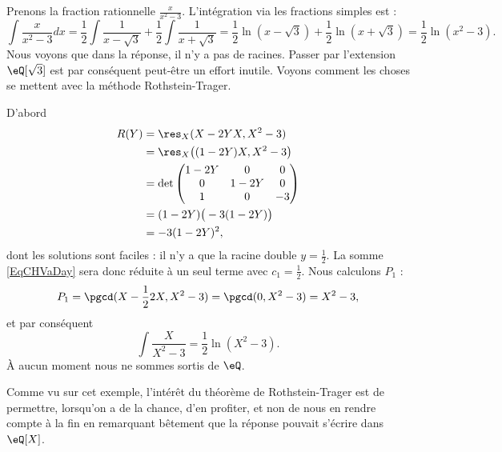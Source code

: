 \begin{example}
	Prenons la fraction rationnelle \( \frac{ x }{ x^2-3 }\). L'intégration via les fractions simples est :
	\begin{equation}
		\int\frac{ x }{ x^2-3 }dx=\frac{ 1 }{2}\int\frac{ 1 }{ x-\sqrt{3} }+\frac{ 1 }{2}\int\frac{1}{ x+\sqrt{3} }=\frac{ 1 }{2}\ln(x-\sqrt{3})+\frac{ 1 }{2}\ln(x+\sqrt{3})=\frac{ 1 }{2}\ln(x^2-3).
	\end{equation}
	Nous voyons que dans la réponse, il n'y a pas de racines. Passer par l'extension \( \eQ[\sqrt{3}]\) est par conséquent peut-être un effort inutile. Voyons comment les choses se mettent avec la méthode Rothstein-Trager.

	D'abord
	\begin{subequations}
		\begin{align}
			R(Y) & =\res_X(X-2YX,X^2-3)             \\
			     & =\res_X\big( (1-2Y)X,X^2-3 \big) \\
			     & =\det\begin{pmatrix}
				1-2Y & 0    & 0  \\
				0    & 1-2Y & 0  \\
				1    & 0    & -3
			\end{pmatrix}  \\
			     & =(1-2Y)\big( -3(1-2Y) \big)      \\
			     & =-3(1-2Y)^2,
		\end{align}
	\end{subequations}
	dont les solutions sont faciles : il n'y a que la racine double \( y=\frac{ 1 }{2}\). La somme \eqref{EqCHVaDay} sera donc réduite à un seul terme avec \( c_1=\frac{ 1 }{2}\). Nous calculons \( P_1\) :
	\begin{equation}
		P_1=\pgcd(X-\frac{ 1 }{2}2X,X^2-3)=\pgcd(0,X^2-3)=X^2-3,
	\end{equation}
	et par conséquent
	\begin{equation}
		\int\frac{ X }{ X^2-3 }=\frac{ 1 }{2}\ln(X^2-3).
	\end{equation}
	À aucun moment nous ne sommes sortis de \( \eQ\).
\end{example}

Comme vu sur cet exemple, l'intérêt du théorème de Rothstein-Trager est de permettre, lorsqu'on a de la chance, d'en profiter, et non de nous en rendre compte à la fin en remarquant bêtement que la réponse pouvait s'écrire dans \( \eQ[X]\).

